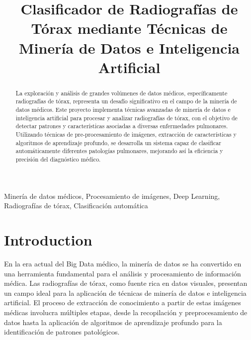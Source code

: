 \documentclass[conference]{IEEEtran}
\begin{document}
\title{Clasificador de Radiografías de Tórax mediante Técnicas de Minería de Datos e Inteligencia Artificial\\}

\author{
\and
{}
}

\maketitle

\begin{abstract}
La exploración y análisis de grandes volúmenes de datos médicos, específicamente radiografías de tórax, representa un desafío significativo en el campo de la minería de datos médicos. Este proyecto implementa técnicas avanzadas de minería de datos e inteligencia artificial para procesar y analizar radiografías de tórax, con el objetivo de detectar patrones y características asociadas a diversas enfermedades pulmonares. Utilizando técnicas de pre-procesamiento de imágenes, extracción de características y algoritmos de aprendizaje profundo, se desarrolla un sistema capaz de clasificar automáticamente diferentes patologías pulmonares, mejorando así la eficiencia y precisión del diagnóstico médico.
\end{abstract}

\begin{IEEEkeywords}
Minería de datos médicos, Procesamiento de imágenes, Deep Learning, Radiografías de tórax, Clasificación automática
\end{IEEEkeywords}

\section{Introduction}
En la era actual del Big Data médico, la minería de datos se ha convertido en una herramienta fundamental para el análisis y procesamiento de información médica. Las radiografías de tórax, como fuente rica en datos visuales, presentan un campo ideal para la aplicación de técnicas de minería de datos e inteligencia artificial. El proceso de extracción de conocimiento a partir de estas imágenes médicas involucra múltiples etapas, desde la recopilación y preprocesamiento de datos hasta la aplicación de algoritmos de aprendizaje profundo para la identificación de patrones patológicos.\\
\end{document}
